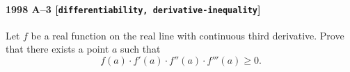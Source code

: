 \paragraph{1998 A--3 \textnormal{[\texttt{differentiability, derivative-inequality}]}}
Let $f$ be a real function on the real line with continuous third
derivative. Prove that there exists a point $a$ such that
\[f(a)\cdot f'(a) \cdot f''(a) \cdot f'''(a)\geq 0 .\]
